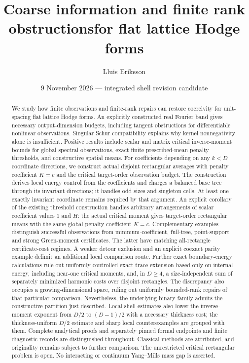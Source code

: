 \documentclass[11pt]{article}
\title{Coarse information and finite rank obstructions\newline for flat lattice Hodge forms}
\author{Lluis Eriksson}
\date{9 November 2026 --- integrated shell revision candidate}
\begin{document}
\maketitle
\begin{abstract}
We study how finite observations and finite-rank repairs can restore coercivity
for unit-spacing flat lattice Hodge forms. An explicitly constructed real Fourier
band gives necessary output-dimension budgets, including tangent obstructions
for differentiable nonlinear observations. Singular Schur compatibility explains
why kernel nonnegativity alone is insufficient. Positive results include scalar
and matrix critical inverse-moment bounds for global spectral observations,
exact finite prescribed-mean penalty thresholds, and constructive spatial means.
For coefficients depending on any $k<D$ coordinate directions, we construct
actual disjoint rectangular averages with penalty coefficient $K=c$ and the
critical target-order observation budget. The construction derives local energy
control from the coefficients and charges a balanced base tree through its
invariant directions; it handles odd sizes and singleton cells. At least one
exactly invariant coordinate remains required by that argument. An explicit corollary of the existing threshold construction handles
arbitrary arrangements of scalar coefficient values $1$ and $H$:
the actual critical moment gives target-order rectangular means with the
same global penalty coefficient $K=c$. Complementary
examples distinguish successful observations from minimum-coefficient, full-tree,
point-support and strong Green-moment certificates. The latter have matching
all-rectangle certificate-cost regimes. A weaker detour exclusion and an explicit
coexact parity example delimit an additional local comparison route.
Further exact boundary-energy calculations rule out uniformly controlled
exact trace extension based only on internal energy, including near-one
critical moments, and, in $D\ge4$, a size-independent
sum of separately minimized harmonic costs over disjoint rectangles.
The discrepancy also occupies a growing-dimensional space, ruling out
uniformly bounded-rank repairs of that particular comparison. Nevertheless,
the underlying binary family admits the constructive partition just described.
Local shell estimates also lower the inverse-moment exponent from $D/2$
to $(D-1)/2$ with a necessary thickness cost; the thickness-uniform
$D/2$ estimate and sharp local counterexamples are grouped with them.
Complete analytical proofs and separately
pinned formal endpoints and finite diagnostic records are distinguished
throughout. Classical methods are attributed, and originality remains subject
to further comparison. The unrestricted critical rectangular problem is open.
No interacting or continuum Yang--Mills mass gap is asserted.
\end{abstract}
\clearpage
\end{document}
